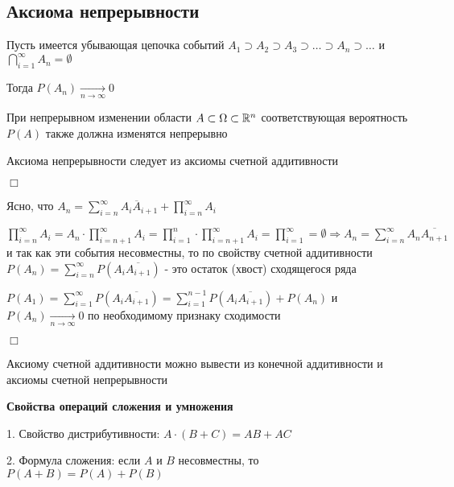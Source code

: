 \documentclass[12pt]{article}
\begin{document}
    \hypertarget{continuityaxiom}{}

    \subsection{Аксиома непрерывности}

    \begin{MyTheorem}
        \Ths Пусть имеется убывающая цепочка событий $A_1 \supset A_2 \supset A_3 \supset \dots \supset A_n \supset \dots$ и $\bigcap_{i = 1}^\infty A_n = \emptyset$

        Тогда $P(A_n) \underset{n \to \infty}{\to} 0$

        При непрерывном изменении области $A \subset \Omega \subset \mathbb{R}^n$ соответствующая вероятность $P(A)$ также должна изменятся непрерывно
    \end{MyTheorem}

    Аксиома непрерывности следует из аксиомы счетной аддитивности

    \begin{tcolorbox}
        $\Box$

        Ясно, что $A_n = \sum_{i = n}^\infty A_i \overline{A}_{i + 1} + \prod_{i = n}^\infty A_i$

        $\prod_{i = n}^\infty A_i = A_n \cdot \prod_{i = n + 1}^\infty A_i = \prod_{i = 1}^n
        \cdot \prod_{i = n + 1}^\infty A_i = \prod_{i = 1}^\infty = \emptyset \Longrightarrow
        A_n = \sum_{i = n}^\infty A_n \overline{A_{n + 1}}$ и так как эти события несовместны,
        то по свойству счетной аддитивности $P(A_n) = \sum_{i = n}^\infty P(A_i \overline{A_{i + 1}})$ - это остаток (хвост) сходящегося ряда

        $P(A_1) = \sum_{i = 1}^\infty P(A_i \overline{A_{i + 1}}) = \sum_{i = 1}^{n - 1} P(A_i \overline{A_{i + 1}}) + P(A_n)$ и $P(A_n) \underset{n \to \infty}{\to} 0$ по необходимому признаку сходимости

        $\Box$
    \end{tcolorbox}

    \Nota Аксиому счетной аддитивности можно вывести из конечной аддитивности и аксиомы счетной непрерывности

    \hypertarget{probabilityoperationsproperties}{}

    \textbf{Свойства операций сложения и умножения}

    1. Свойство дистрибутивности: $A \cdot (B + C) = AB + AC$

    2. Формула сложения: если $A$ и $B$ несовместны, то $P(A + B) = P(A) + P(B)$
\end{document}
